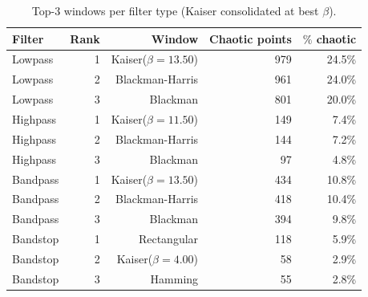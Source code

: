 \begin{table}[htbp]
  \centering
  \caption{Top-3 windows per filter type (Kaiser consolidated at best $\beta$).}
  \begin{tabular}{lrrrr}
    \toprule
    Filter & Rank & Window & Chaotic points & $\%$ chaotic \\
    \midrule
    Lowpass & 1 & Kaiser($\beta=13.50$) & 979 & 24.5\% \\
    Lowpass & 2 & Blackman-Harris & 961 & 24.0\% \\
    Lowpass & 3 & Blackman & 801 & 20.0\% \\
    Highpass & 1 & Kaiser($\beta=11.50$) & 149 & 7.4\% \\
    Highpass & 2 & Blackman-Harris & 144 & 7.2\% \\
    Highpass & 3 & Blackman & 97 & 4.8\% \\
    Bandpass & 1 & Kaiser($\beta=13.50$) & 434 & 10.8\% \\
    Bandpass & 2 & Blackman-Harris & 418 & 10.4\% \\
    Bandpass & 3 & Blackman & 394 & 9.8\% \\
    Bandstop & 1 & Rectangular & 118 & 5.9\% \\
    Bandstop & 2 & Kaiser($\beta=4.00$) & 58 & 2.9\% \\
    Bandstop & 3 & Hamming & 55 & 2.8\% \\
    \bottomrule
  \end{tabular}
\end{table}
